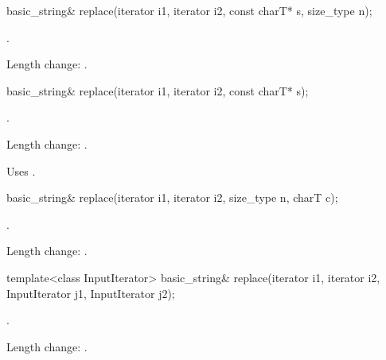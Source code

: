 %
%
\begin{itemdecl}
basic_string&
  replace(iterator i1, iterator i2, const charT* s, size_type n);
\end{itemdecl}

\begin{itemdescr}
\pnum
\returns
{}.

\pnum
\notes
Length change: .
\end{itemdescr}

%
%
\begin{itemdecl}
basic_string& replace(iterator i1, iterator i2, const charT* s);
\end{itemdecl}

\begin{itemdescr}
\pnum
\returns
{}.

\pnum
\notes
Length change: .

Uses .
\end{itemdescr}

%
%
\begin{itemdecl}
basic_string& replace(iterator i1, iterator i2, size_type n,
                      charT c);
\end{itemdecl}

\begin{itemdescr}
\pnum
\returns
{}.

\pnum
\notes
Length change: .
\end{itemdescr}

%
%
\begin{itemdecl}
template<class InputIterator>
  basic_string& replace(iterator i1, iterator i2,
                        InputIterator j1, InputIterator j2);
\end{itemdecl}

\begin{itemdescr}
\pnum
\returns
{}.

\pnum
\notes
Length change: .
\end{itemdescr}


